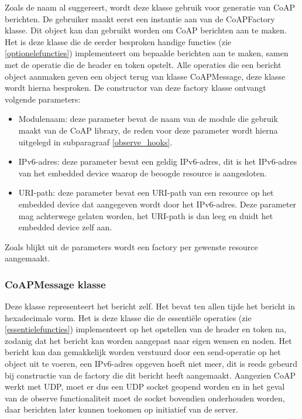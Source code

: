 Zoals de naam al suggereert, wordt deze klasse gebruik voor generatie van CoAP berichten. De gebruiker maakt eerst een instantie aan van de CoAPFactory klasse. Dit object kan dan gebruikt worden om CoAP berichten aan te maken. Het is deze klasse die de eerder besproken handige functies (zie \ref{optionelefuncties}) implementeert om bepaalde berichten aan te maken, samen met de operatie die de header en token opstelt. Alle operaties die een bericht object aanmaken geven een object terug van klasse CoAPMessage, deze klasse wordt hierna besproken. De constructor van deze factory klasse ontvangt volgende parameters:
\begin{itemize}
\item Modulenaam: deze parameter bevat de naam van de module die gebruik maakt van de CoAP library, de reden voor deze parameter wordt hierna uitgelegd in subparagraaf \ref{observe_hooks}.
\item IPv6-adres: deze parameter bevat een geldig IPv6-adres, dit is het IPv6-adres van het embedded device waarop de beoogde resource is aangesloten.
\item URI-path: deze parameter bevat een URI-path van een resource op het embedded device dat aangegeven wordt door het IPv6-adres. Deze parameter mag achterwege gelaten worden, het URI-path is dan leeg en duidt het embedded device zelf aan.
\end{itemize}
Zoals blijkt uit de parameters wordt een factory per gewenste resource aangemaakt.

\subsubsection{CoAPMessage klasse}

Deze klasse representeert het bericht zelf. Het bevat ten allen tijde het bericht in hexadecimale vorm. Het is deze klasse die de essenti\"{e}le operaties (zie \ref{essentielefuncties}) implementeert op het opstellen van de header en token na, zodanig dat het bericht kan worden aangepast naar eigen wensen en noden. Het bericht kan dan gemakkelijk worden verstuurd door een send-operatie op het object uit te voeren, een IPv6-adres opgeven hoeft niet meer, dit is reeds gebeurd bij constructie van de factory die dit bericht heeft aangemaakt. Aangezien CoAP werkt met UDP, moet er dus een UDP socket geopend worden en in het geval van de observe functionaliteit moet de socket bovendien onderhouden worden, daar berichten later kunnen toekomen op initiatief van de server.

